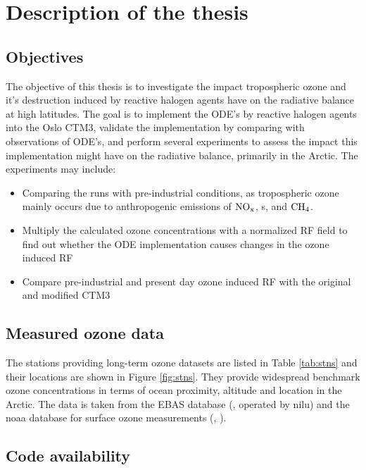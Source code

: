 \section{Description of the thesis}

\subsection{Objectives}

The objective of this thesis is to investigate the impact tropospheric ozone and it's destruction induced by reactive halogen agents have on the radiative balance at high latitudes. The goal is to implement the ODE's by reactive halogen agents into the Oslo CTM3, validate the implementation by comparing with observations of ODE's, and perform several experiments to assess the  impact this implementation might have on the radiative balance, primarily in the Arctic. The experiments may include: 

\begin{itemize}
    \item Comparing the runs with pre-industrial conditions, as tropospheric ozone mainly occurs due to anthropogenic emissions of $\mathrm{NO_x}$, s,  and $\mathrm{CH_4}$.
    \item Multiply the calculated ozone concentrations with a normalized RF field to find out whether the ODE implementation causes changes in the ozone induced RF
    \item Compare pre-industrial and present day ozone induced RF with the original and modified CTM3
\end{itemize}

\subsection{Measured ozone data}

The stations providing long-term ozone datasets are listed in Table \ref{tab:stns} and their locations are shown in Figure \ref{fig:stns}. They provide widespread benchmark ozone concentrations in terms of ocean proximity, altitude and location in the Arctic. The data is taken from the EBAS database (\cite{EBAS}, operated by \acrfull{nilu}) and the \acrfull{noaa} database for surface ozone measurements (\cite{NOAA}, \cite{McClure_Begley_NOAA}).




\subsection{Code availability}

